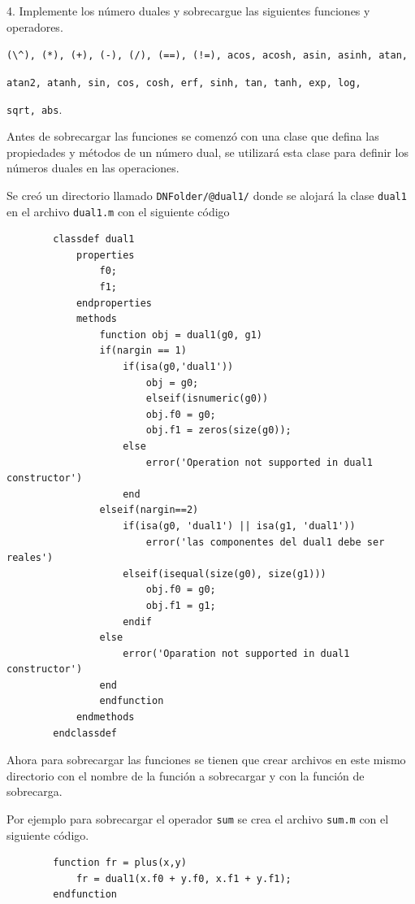 \documentclass[a4paper, 12pt]{article}
\begin{document}
    4. Implemente los número duales y sobrecargue las siguientes funciones y operadores.

    \verb|(\^), (*), (+), (-), (/), (==), (!=), acos, acosh, asin, asinh, atan,|
    
    \verb|atan2, atanh, sin, cos, cosh, erf, sinh, tan, tanh, exp, log,|
    
    \verb|sqrt, abs|.

    Antes de sobrecargar las funciones se comenzó con una clase que defina las propiedades y métodos de un número dual, se utilizará esta clase para definir los números duales en las operaciones.

    Se creó un directorio llamado \verb|DNFolder/@dual1/| donde se alojará la clase \verb|dual1| en el archivo \verb|dual1.m| con el siguiente código

    \begin{verbatim}
        classdef dual1
            properties
                f0;
                f1;
            endproperties
            methods
                function obj = dual1(g0, g1)
                if(nargin == 1)
                    if(isa(g0,'dual1'))
                        obj = g0;
                        elseif(isnumeric(g0))
                        obj.f0 = g0;
                        obj.f1 = zeros(size(g0));
                    else
                        error('Operation not supported in dual1 constructor')
                    end
                elseif(nargin==2)
                    if(isa(g0, 'dual1') || isa(g1, 'dual1'))
                        error('las componentes del dual1 debe ser reales')
                    elseif(isequal(size(g0), size(g1)))
                        obj.f0 = g0;
                        obj.f1 = g1;
                    endif
                else
                    error('Oparation not supported in dual1 constructor')
                end
                endfunction
            endmethods
        endclassdef
    \end{verbatim}

    Ahora para sobrecargar las funciones se tienen que crear archivos en este mismo directorio con el nombre de la función a sobrecargar y con la función de sobrecarga.

    Por ejemplo para sobrecargar el operador \verb|sum| se crea el archivo \verb|sum.m| con el siguiente código.

    \begin{verbatim}
        function fr = plus(x,y)
            fr = dual1(x.f0 + y.f0, x.f1 + y.f1);
        endfunction
    \end{verbatim}
\end{document}
